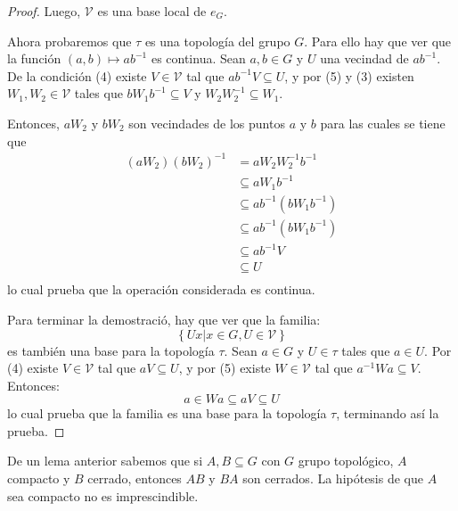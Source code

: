 \documentclass[12pt]{report}
\theoremstyle{largebreak}
\begin{document}
\begin{proof}
        Luego, $\mathcal{V}$ es una base local de $e_G$.

        Ahora probaremos que $\tau$ es una topología del grupo $G$. Para ello hay que ver que la función $(a,b)\mapsto ab^{-1}$ es continua. Sean $a,b\in G$ y $U$ una vecindad de $ab^{-1}$. De la condición (4) existe $V\in\mathcal{V}$ tal que $ab^{-1}V\subseteq U$, y por (5) y (3) existen $W_1,W_2\in\mathcal{V}$ tales que $bW_1b^{-1}\subseteq V$ y $W_2W_2^{-1}\subseteq W_1$.

        Entonces, $aW_2$ y $bW_2$ son vecindades de los puntos $a$ y $b$ para las cuales se tiene que
        \begin{equation*}
            \begin{split}
                (aW_2)(bW_2)^{-1}&=aW_2W_2^{-1}b^{-1}\\
                &\subseteq aW_1b^{-1}\\
                &\subseteq ab^{-1}(bW_1b^{-1})\\
                &\subseteq ab^{-1}(bW_1b^{-1})\\
                &\subseteq ab^{-1}V\\
                &\subseteq U\\
            \end{split}
        \end{equation*}
        lo cual prueba que la operación considerada es continua.

        Para terminar la demostració, hay que ver que la familia:
        \begin{equation*}
            \left\{Ux\Big|x\in G, U\in\mathcal{V} \right\}
        \end{equation*}
        es también una base para la topología $\tau$. Sean $a\in G$ y $U\in\tau$ tales que $a\in U$. Por (4) existe $V\in\mathcal{V}$ tal que $aV\subseteq U$, y por (5) existe $W\in\mathcal{V}$ tal que $a^{-1}Wa\subseteq V$. Entonces:
        \begin{equation*}
            a\in Wa\subseteq aV\subseteq U
        \end{equation*}
        lo cual prueba que la familia es una base para la topología $\tau$, terminando así la prueba.

    \end{proof}

    De un lema anterior sabemos que si $A,B\subseteq G$ con $G$ grupo topológico, $A$ compacto y $B$ cerrado, entonces $AB$ y $BA$ son cerrados. La hipótesis de que $A$ sea compacto no es imprescindible.
\end{document}
